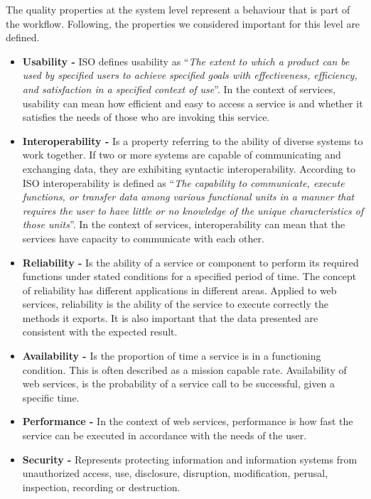 The quality properties at the system level represent a behaviour that is part of
the workflow. Following, the properties we considered important for this level
are defined.

\begin{itemize}
  \item \textbf{Usability -} ISO defines usability as ``\textit{The extent to which a
  product can be used by specified users to achieve specified goals with
  effectiveness, efficiency, and satisfaction in a specified context of use}''. 
  In the context of services, usability can mean how efficient and
  easy to access a service is and whether it satisfies the needs of those who
  are invoking this service.
  \item \textbf{Interoperability -} Is a property referring to
  the ability of diverse systems to work together. If two or
  more systems are capable of communicating and exchanging data, they are
  exhibiting syntactic interoperability. According to ISO interoperability is
  defined as ``\textit{The capability to communicate, execute functions, or transfer
  data among various functional units in a manner that requires the user to have
  little or no knowledge of the unique characteristics of those units}''. In the
  context of services, interoperability can mean that the services have capacity
  to communicate with each other. 
  \item \textbf{Reliability -} Is the ability of a
  service or component to perform its required functions under stated conditions
  for a specified period of time. The concept of reliability has different
  applications in different areas. Applied to web services, reliability is the
  ability of the service to execute correctly the methods it exports. It is also
  important that the data presented are consistent with the expected result.
  \item \textbf{Availability -}  Is the proportion of time a service 
  is in a functioning condition. This is often described as a mission capable
  rate. Availability of web services, is the probability of a service call 
  to be successful, given a specific time.
  \item \textbf{Performance -} In the context of web services, performance is how fast the service can be
  executed in accordance with the needs of the user.
  \item \textbf{Security -} Represents protecting information and
  information systems from unauthorized access, use, disclosure, disruption,
  modification, perusal, inspection, recording or destruction.  
\end{itemize}


